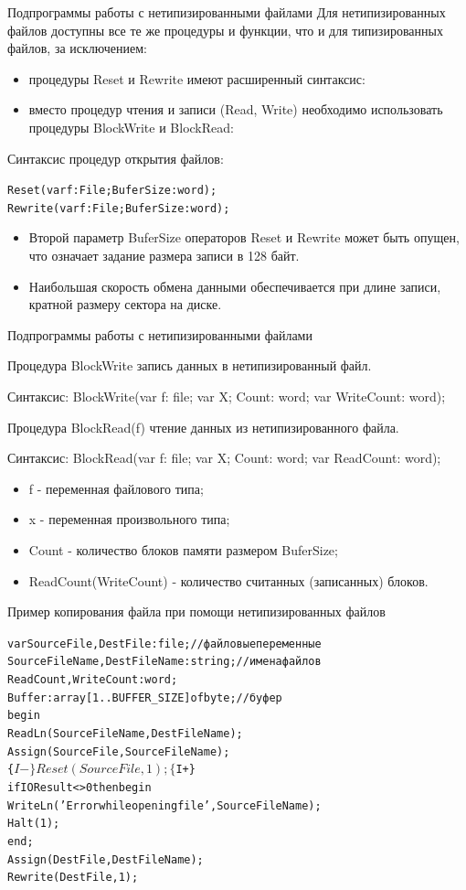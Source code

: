 \documentclass{beamer}
\begin{document}
\begin{frame}[fragile]{Подпрограммы работы с нетипизированными файлами}
Для нетипизированных файлов доступны все те же процедуры и функции, что и для типизированных файлов, за исключением:
\begin{itemize}
\item процедуры Reset и Rewrite имеют расширенный синтаксис:
\item вместо процедур чтения и записи (Read, Write) необходимо использовать процедуры BlockWrite и BlockRead:
\end{itemize}
Синтаксис процедур открытия файлов:
\begin{alltt}
Reset(var f: File; BuferSize: word);
Rewrite(var f: File; BuferSize: word) ;
\end{alltt}
\begin{itemize}
\item Второй параметр BuferSize операторов Reset и Rewrite может быть опущен, что означает задание размера записи в 128 байт. 
\item Наибольшая скорость обмена данными обеспечивается при длине записи, кратной размеру сектора на диске.
\end{itemize}
\end{frame}

\begin{frame}[fragile]{Подпрограммы работы с нетипизированными файлами}
\begin{block}{Процедура BlockWrite}
запись данных в нетипизированный файл.
\end{block}
Синтаксис: BlockWrite(var f: file; var X; Count: word; var WriteCount: word);
\begin{block}{Процедура BlockRead(f)}
чтение данных из нетипизированного файла.
\end{block}
Синтаксис: BlockRead(var f: file; var X; Count: word; var ReadCount: word);
\begin{itemize}
\item f - переменная файлового типа;
\item x - переменная произвольного типа;
\item Count - количество блоков памяти размером BuferSize;
\item ReadCount(WriteCount) - количество считанных (записанных) блоков.
\end{itemize}
\end{frame}

\begin{frame}[fragile]{Пример копирования файла при помощи нетипизированных файлов}
\begin{alltt}
var SourceFile, DestFile: file; //файловые переменные
  SourceFileName, DestFileName: string; //имена файлов
  ReadCount, WriteCount: word; 
  Buffer: array[1..BUFFER_SIZE] of byte; // буфер
begin
  ReadLn(SourceFileName, DestFileName);  
  Assign(SourceFile, SourceFileName);
  \{$I-\}Reset(SourceFile, 1);\{$I+\}
  if IOResult <> 0 then begin
    WriteLn('Error while opening file ', SourceFileName);
    Halt(1);
  end;
  Assign(DestFile, DestFileName);
  Rewrite(DestFile, 1);
\end{alltt}
\end{frame}
\end{document}
